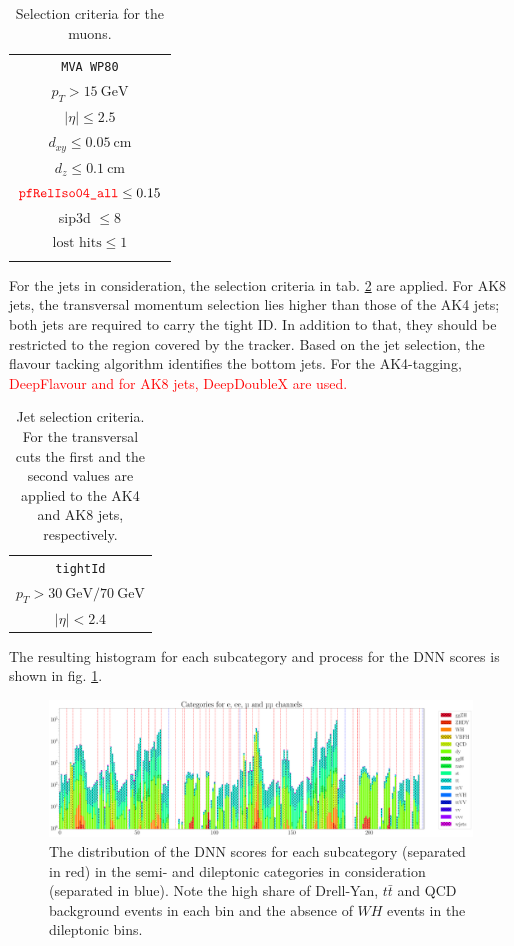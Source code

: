 \begin{table}[h!]
	\centering
	\begin{tabular}{c}
		\hline
		\texttt{MVA WP80} \\
		$p_T > \SI{15}{\giga\electronvolt} $\\
		$|\eta| \leq 2.5$ \\
		$d_{xy} \leq \SI{0.05}{\centi\meter}$ \\
		$d_z \leq \SI{0.1}{\centi\meter}$ \\
		$\textcolor{red}{\texttt{pfRelIso04\_all}} \leq 0.15$  \\
		sip3d $\leq 8$ \\
		$\text{lost hits} \leq 1$ \\
		\hline \\
	\end{tabular}
	\caption{Selection criteria for the muons.}
	\label{tab:electron_selection}
\end{table}

For the jets in consideration, the selection criteria in tab. \ref{tab:jet_selection} are applied. For AK8 jets, the transversal momentum selection lies higher than those of the AK4 jets; both jets are required to carry the tight ID. In addition to that, they should be restricted to the region covered by the tracker. Based on the jet selection, the flavour tacking algorithm identifies the bottom jets. For the AK4-tagging, \textcolor{red}{DeepFlavour and for AK8 jets, DeepDoubleX are used.}

\begin{table}[h!]
	\centering
	\begin{tabular}{c}
		\hline
		\texttt{tightId} \\
		$p_T > \SI{30}{\giga\electronvolt}/ \SI{70}{\giga\electronvolt}$ \\
		$|\eta| < 2.4$ \\
		\hline
	\end{tabular}
	\caption{Jet selection criteria. For the transversal cuts the first and the second values are applied to the AK4 and AK8 jets, respectively.}
	\label{tab:jet_selection}
\end{table}

The resulting histogram for each subcategory and process for the DNN scores is shown in fig. \ref{fig:conditions}.

\begin{figure}[h!]
	\centering
	\includegraphics[width=1.1\linewidth]{figures/analysis/cond4_notOrdered.pdf}
	\caption{The distribution of the DNN scores for each subcategory (separated in red) in the semi- and dileptonic categories in consideration (separated in blue). Note the high share of Drell-Yan, $t\bar{t}$ and QCD background events in each bin and the absence of $WH$ events in the dileptonic bins.}
	\label{fig:conditions}
\end{figure}